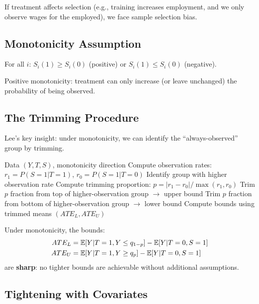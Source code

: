 If treatment affects selection (e.g., training increases employment, and we only observe wages for the employed), we face sample selection bias.

\subsection{Monotonicity Assumption}

\begin{assumption}
\label{ass:lee_mono}
For all $i$: $S_i(1) \geq S_i(0)$ (positive) or $S_i(1) \leq S_i(0)$ (negative).
\end{assumption}

Positive monotonicity: treatment can only increase (or leave unchanged) the probability of being observed.

\subsection{The Trimming Procedure}

Lee's key insight: under monotonicity, we can identify the ``always-observed'' group by trimming.

\begin{algorithm}[htbp]
\caption{Lee Bounds}
\label{alg:lee_bounds}
\begin{algorithmic}[1]
\REQUIRE Data $(Y, T, S)$, monotonicity direction
\STATE Compute observation rates: $r_1 = P(S=1|T=1)$, $r_0 = P(S=1|T=0)$
\STATE Identify group with higher observation rate
\STATE Compute trimming proportion: $p = |r_1 - r_0| / \max(r_1, r_0)$
\STATE Trim $p$ fraction from top of higher-observation group $\to$ upper bound
\STATE Trim $p$ fraction from bottom of higher-observation group $\to$ lower bound
\STATE Compute bounds using trimmed means
\RETURN $(ATE_L, ATE_U)$
\end{algorithmic}
\end{algorithm}

\begin{theorem}
\label{thm:lee_bounds}
Under monotonicity, the bounds:
\begin{align*}
ATE_L &= \mathbb{E}[Y | T=1, Y \leq q_{1-p}] - \mathbb{E}[Y | T=0, S=1] \\
ATE_U &= \mathbb{E}[Y | T=1, Y \geq q_p] - \mathbb{E}[Y | T=0, S=1]
\end{align*}
are \textbf{sharp}: no tighter bounds are achievable without additional assumptions.
\end{theorem}

\subsection{Tightening with Covariates}

